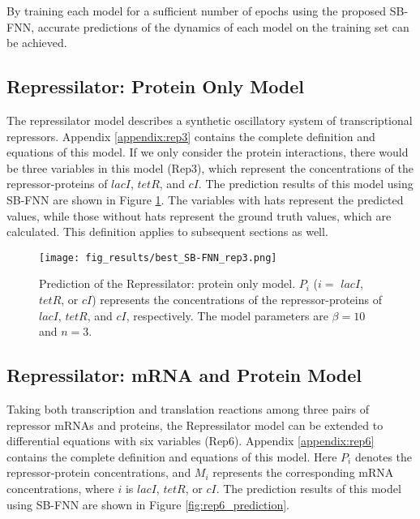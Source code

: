 
By training each model for a sufficient number of epochs using the proposed SB-FNN, accurate predictions of the dynamics of each model on the training set can be achieved.

\subsection{Repressilator: Protein Only Model}
The repressilator model \cite{elowitz2000synthetic} describes a synthetic oscillatory system of transcriptional repressors. Appendix \ref{appendix:rep3} contains the complete definition and equations of this model. If we only consider the protein interactions, there would be three variables in this model (Rep3), which represent the concentrations of the repressor-proteins of $lacI$, $tetR$, and $cI$. The prediction results of this model using SB-FNN are shown in Figure \ref{fig:rep3_prediction}. The variables with hats represent the predicted values, while those without hats represent the ground truth values, which are calculated. This definition applies to subsequent sections as well.

\begin{figure}[h]
\centering
\texttt{[image: fig\_results/best\_SB-FNN\_rep3.png]}
\caption[Prediction of the Repressilator: protein only model] {Prediction of the Repressilator: protein only model. $P_{i}$ ($i=$ $lacI$, $tetR$, or $cI$) represents the concentrations of the repressor-proteins of $lacI$, $tetR$, and $cI$, respectively. The model parameters are $\beta = 10$ and $n=3$.}
\label{fig:rep3_prediction}
\end{figure}

\subsection{Repressilator: mRNA and Protein Model}
Taking both transcription and translation reactions among three pairs of repressor mRNAs and proteins, the Repressilator model can be extended to differential equations with six variables (Rep6). Appendix \ref{appendix:rep6} contains the complete definition and equations of this model. Here $P_{i}$ denotes the repressor-protein concentrations, and $M_{i}$ represents the corresponding mRNA concentrations, where $i$ is $lacI$, $tetR$, or $cI$. The prediction results of this model using SB-FNN are shown in Figure \ref{fig:rep6_prediction}.

